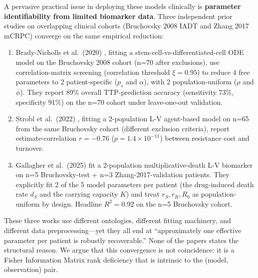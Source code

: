 \documentclass[11pt]{article}
\begin{document}
A pervasive practical issue in deploying these models clinically is
\textbf{parameter identifiability from limited biomarker data}. Three independent
prior studies on overlapping clinical cohorts (Bruchovsky 2008 IADT and
Zhang 2017 mCRPC) converge on the same empirical reduction:

\begin{enumerate}
\item Brady-Nicholls et al.\ (2020) \cite{BradyNicholls2020}, fitting a
stem-cell-vs-differentiated-cell ODE model on the Bruchovsky 2008 cohort (n=70
after exclusions), use correlation-matrix screening (correlation threshold
$\xi = 0.95$) to reduce 4 free parameters to 2 patient-specific ($p_s$ and
$\alpha$), with 2 population-uniform ($\rho$ and $\phi$). They report 89\%
overall TTP-prediction accuracy (sensitivity 73\%, specificity 91\%) on the n=70
cohort under leave-one-out validation.
\item Strobl et al.\ (2022) \cite{Strobl2022}, fitting a 2-population L-V
agent-based model on n=65 from the same Bruchovsky cohort (different exclusion
criteria), report estimate-correlation $r = -0.76$
($p = 1.4 \times 10^{-11}$) between resistance cost and turnover.
\item Gallagher et al.\ (2025) \cite{Gallagher2025} fit a 2-population
multiplicative-death L-V biomarker on n=5 Bruchovsky-test + n=3 Zhang-2017-validation
patients. They explicitly fit 2 of the 5 model parameters per patient (the
drug-induced death rate $d_S$ and the carrying capacity $K$) and treat
$r_S, r_R, R_0$ as population-uniform by design. Headline $R^2 = 0.92$ on the
n=5 Bruchovsky cohort.
\end{enumerate}

These three works use different ontologies, different fitting machinery, and
different data preprocessing---yet they all end at ``approximately one effective
parameter per patient is robustly recoverable.'' None of the papers states the
structural reason. We argue that this convergence is not coincidence: it is a
Fisher Information Matrix rank deficiency that is intrinsic to the (model,
observation) pair.
\end{document}
